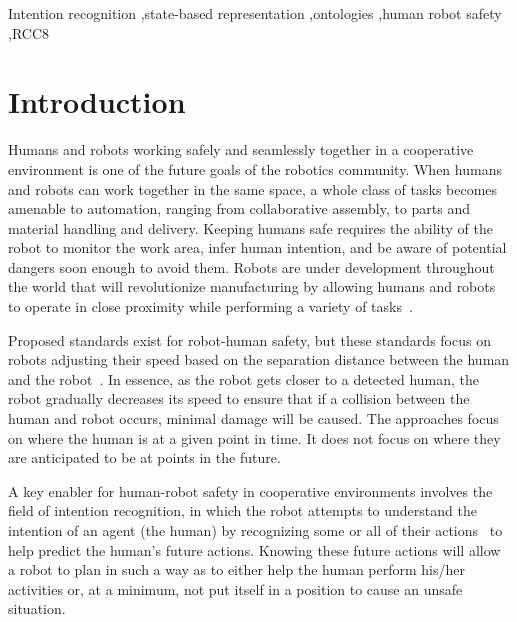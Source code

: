 \documentclass[final,1p,times]{elsarticle}
\begin{document}
\begin{frontmatter}
\begin{keyword}
Intention recognition \sep state-based representation \sep ontologies \sep human robot safety \sep RCC8

\end{keyword}

\end{frontmatter}


\section{Introduction}
\label{S:INTRO}

Humans and robots working safely and seamlessly together in a cooperative environment is one of the future goals of the robotics community. When humans and robots can work together in the same space, a whole class of tasks becomes amenable to automation, ranging from collaborative assembly, to parts and material handling and delivery. Keeping humans safe requires the ability of the robot to monitor the work area, infer human intention, and be aware of potential dangers soon enough to avoid them. Robots are under development throughout the world that will revolutionize manufacturing by allowing humans and robots to operate in close proximity while performing a variety of tasks~\cite{SZABO.2011}.

Proposed standards exist for robot-human safety, but these standards focus on robots adjusting their speed based on the separation distance between the human and the robot~\cite{CHABROL.1987}. In essence, as the robot gets closer to a detected human, the robot gradually decreases its speed to ensure that if a collision between the human and robot occurs, minimal damage will be caused. The approaches focus on where the human is at a given point in time. It does not focus on where they are anticipated to be at points in the future.

A key enabler for human-robot safety in cooperative environments involves the field of intention recognition, in which the robot attempts to understand the intention of an agent (the human) by recognizing some or all of their actions~\cite{SADRI.2011} to help predict the human's future actions. Knowing these future actions will allow a robot to plan in such a way as to either help the human perform his/her activities or, at a minimum, not put itself in a position to cause an unsafe situation.
\end{document}
